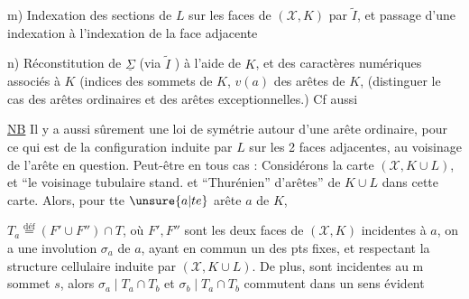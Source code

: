 m) Indexation des sections de $L$ sur les faces de $(\mathcal X,K)$  par $\widetilde I$, et passage d'une indexation à l'indexation de la face adjacente

n) Réconstitution de  $\underline{\Sigma}$ (via $\widetilde I$ \unsure{---}) à l'aide de $K$, et des caractères numériques associés à $K$ (indices des  sommets de $K$,  $v(a)$ des arêtes  de $K$,  (distinguer le cas des arêtes ordinaires et des arêtes exceptionnelles.) Cf aussi

\uline{NB} Il y a aussi sûrement une loi de symétrie autour d'une arête ordinaire, pour ce qui est de la configuration induite par $L$ sur les 2 faces adjacentes, au voisinage de l'arête en question. Peut-être  en tous cas : Considérons la carte $(\mathcal X,K\cup L)$, et ``le voisinage tubulaire stand. et ``Thurénien'' d'arêtes'' de   $K\cup L$ dans cette carte.  Alors, pour tte $\unsure{a|te}$ arête $a$ de $K$, 


$T_a\overset{\mathrm{déf}}{=}(F'\cup F'')\cap T$, où $F',F''$ sont les deux faces de $(\mathcal X,K)$ incidentes à $a$, on a une involution \deleted{\unsure{$\varphi$}} $\sigma_a$ de $a$, ayant en commun un des pts fixes, et respectant la structure cellulaire induite par $(\mathcal X,K\cup L)$. De plus,  sont incidentes au m sommet $s$, alors $\sigma_a\mid T_a\cap T_b$ et $\sigma_b\mid T_a\cap T_b$ commutent dans un sens évident
